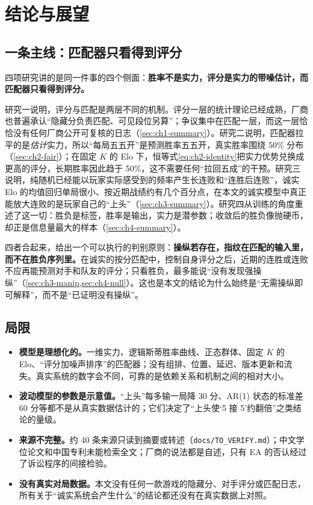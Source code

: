 \chapter*{结论与展望}

\section*{一条主线：匹配器只看得到评分}

四项研究讲的是同一件事的四个侧面：\textbf{胜率不是实力，评分是实力的带噪估计，而匹配器只看得到评分。}

研究一说明，评分与匹配是两层不同的机制。评分一层的统计理论已经成熟，厂商也普遍承认“隐藏分负责匹配、可见段位另算”；争议集中在匹配一层，而这一层恰恰没有任何厂商公开可复核的日志（\cref{sec:ch1-summary}）。研究二说明，匹配器拉平的是\emph{估计}实力，所以“每局五五开”是预测胜率五五开，真实胜率围绕 50\% 分布（\cref{sec:ch2-fair}）；在固定 $K$ 的 Elo 下，恒等式\cref{eq:ch2-identity}把实力优势兑换成更高的评分，长期胜率因此趋于 50\%，这不需要任何“拉回五成”的干预。研究三说明，纯随机已经能以玩家实际感受到的频率产生长连败和“连胜后连败”，诚实 Elo 的均值回归单局很小、按近期战绩约有几个百分点，在本文的诚实模型中真正能放大连败的是玩家自己的“上头”（\cref{sec:ch3-summary}）。研究四从训练的角度重述了这一切：胜负是标签，胜率是输出，实力是潜参数；收敛后的胜负像抛硬币，却正是信息量最大的样本（\cref{sec:ch4-summary}）。

四者合起来，给出一个可以执行的判别原则：\textbf{操纵若存在，指纹在匹配的输入里，而不在胜负序列里。}在诚实的按分匹配中，控制自身评分之后，近期的连胜或连败不应再能预测对手和队友的评分；只看胜负，最多能说“没有发现强操纵”（\cref{sec:ch3-manip,sec:ch4-null}）。这也是本文的结论为什么始终是“无需操纵即可解释”，而不是“已证明没有操纵”。

\section*{局限}

\begin{itemize}
  \item \textbf{模型是理想化的。}一维实力、逻辑斯蒂胜率曲线、正态群体、固定 $K$ 的 Elo、“评分加噪声排序”的匹配器；没有组排、位置、延迟、版本更新和流失。真实系统的数字会不同，可靠的是依赖关系和机制之间的相对大小。
  \item \textbf{波动模型的参数是示意值。}“上头”每多输一局降 30 分、AR(1) 状态的标准差 60 分等都不是从真实数据估计的；它们决定了“上头使‘5 接 5’约翻倍”之类结论的量级。
  \item \textbf{来源不完整。}约 40 条来源只读到摘要或转述（\texttt{docs/TO\_VERIFY.md}）；中文学位论文和中国专利未能检索全文；厂商的说法都是自述，只有 EA 的否认经过了诉讼程序的间接检验。
  \item \textbf{没有真实对局数据。}本文没有任何一款游戏的隐藏分、对手评分或匹配日志，所有关于“诚实系统会产生什么”的结论都还没有在真实数据上对照。
\end{itemize}

